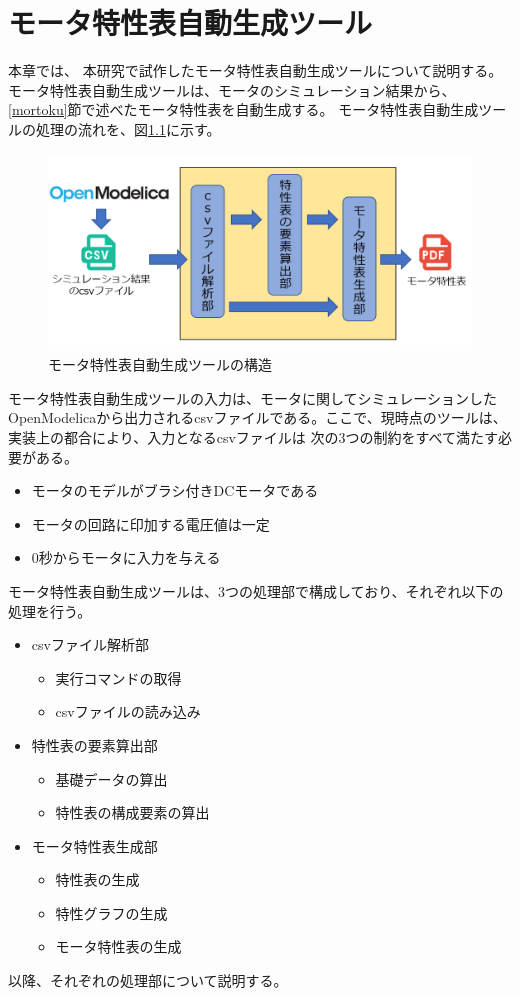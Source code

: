 \chapter{モータ特性表自動生成ツール}\label{cha:Tool}
本章では、 本研究で試作したモータ特性表自動生成ツールについて説明する。
モータ特性表自動生成ツールは、モータのシミュレーション結果から、\ref{mortoku}節で述べたモータ特性表を自動生成する。
モータ特性表自動生成ツールの処理の流れを、図\ref{fig:kouzou}に示す。
\begin{figure}[t]
	\centering
	\includegraphics[width=14cm]{./Image/kouzou.png}
    \caption{モータ特性表自動生成ツールの構造}
	\label{fig:kouzou}
  \end{figure}
モータ特性表自動生成ツールの入力は、モータに関してシミュレーションしたOpenModelicaから出力されるcsvファイルである。ここで、現時点のツールは、実装上の都合により、入力となるcsvファイルは
次の3つの制約をすべて満たす必要がある。
\begin{itemize}
    \item モータのモデルがブラシ付きDCモータである
    \item モータの回路に印加する電圧値は一定
    \item 0秒からモータに入力を与える
\end{itemize}
モータ特性表自動生成ツールは、3つの処理部で構成しており、それぞれ以下の処理を行う。
\begin{itemize}
    \item csvファイル解析部
    \begin{itemize}
        \item 実行コマンドの取得
        \item csvファイルの読み込み
    \end{itemize}
    \item 特性表の要素算出部
    \begin{itemize}
        \item 基礎データの算出
        \item 特性表の構成要素の算出
    \end{itemize}
    \item モータ特性表生成部
    \begin{itemize}
        \item 特性表の生成
        \item 特性グラフの生成
        \item モータ特性表の生成
    \end{itemize}
\end{itemize}
以降、それぞれの処理部について説明する。
